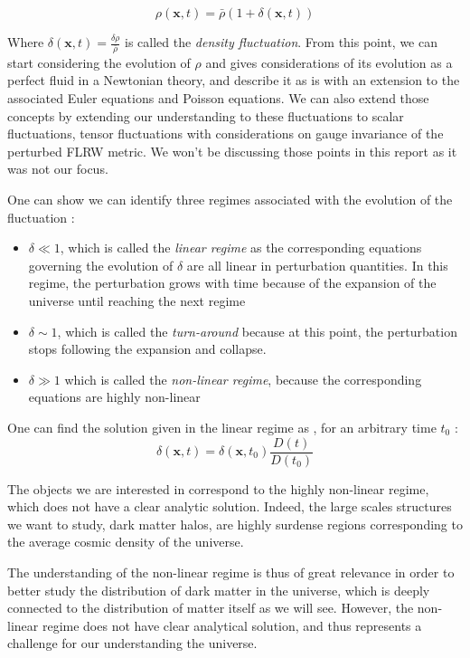 \begin{equation}
\label{Perturbat}
\rho (\textbf{x}, t) = \bar{\rho} (1 + \delta (\textbf{x}, t) )
\end{equation}

Where $\delta (\textbf{x}, t) = \frac{\delta \rho}{\bar{\rho}}$ is called the \textit{density fluctuation}. From this point, we can start considering the evolution of $\rho$ and gives considerations of its evolution as a perfect fluid in a Newtonian theory, and describe it as is with an extension to the associated Euler equations and Poisson equations. We can also extend those concepts by extending our understanding to these fluctuations to scalar fluctuations, tensor fluctuations with considerations on gauge invariance of the perturbed FLRW metric. We won't be discussing those points in this report as it was not our focus.


One can show we can identify three regimes associated with the evolution of the fluctuation :
\begin{itemize}
    \item $\delta \ll 1$, which is called the \textit{linear regime} as the corresponding equations governing the evolution of $\delta$ are all linear in perturbation quantities. In this regime, the perturbation grows with time because of the expansion of the universe until reaching the next regime
    \item $\delta \sim 1$, which is called the \textit{turn-around} because at this point, the perturbation stops following the expansion and collapse.
    \item $\delta \gg 1$ which is called the \textit{non-linear regime}, because the corresponding equations are highly non-linear
\end{itemize}


One can find the solution given in the linear regime as \cite{LaC}, for an arbitrary time $t_0$ :
\begin{equation}
\label{linear}
\delta (\textbf{x}, t) = \delta (\textbf{x}, t_0) \frac{D(t)}{D(t_0)}
\end{equation}

The objects we are interested in correspond to the highly non-linear regime, which does not have a clear analytic solution. Indeed, the large scales structures we want to study, dark matter halos, are highly surdense regions corresponding to the average cosmic density of the universe. 

The understanding of the non-linear regime is thus of great relevance in order to better study the distribution of dark matter in the universe, which is deeply connected to the distribution of matter itself as we will see. However, the non-linear regime does not have clear analytical solution, and thus represents a challenge for our understanding the universe.


